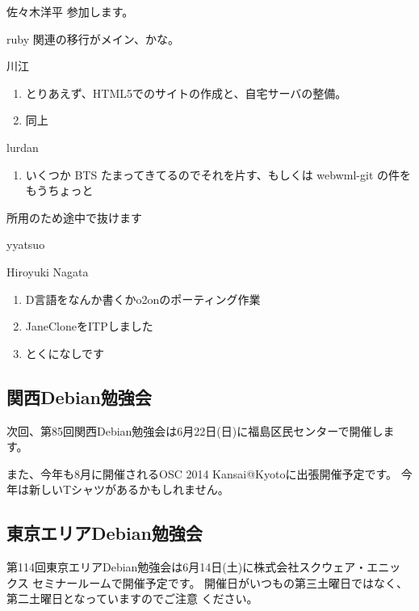 \documentclass[mingoth,a4paper]{jsarticle}
\begin{document}
\begin{prework}{ 佐々木洋平 }
  参加します。

  ruby 関連の移行がメイン、かな。
\end{prework}

\begin{prework}{ 川江 }
  \begin{enumerate}
  \item とりあえず、HTML5でのサイトの作成と、自宅サーバの整備。
  \item 同上
  \end{enumerate}
\end{prework}

\begin{prework}{ lurdan }
  \begin{enumerate}
  \item いくつか BTS たまってきてるのでそれを片す、もしくは webwml-git の件をもうちょっと
  \end{enumerate}

  所用のため途中で抜けます
\end{prework}

\begin{prework}{ yyatsuo }
\end{prework}

\begin{prework}{ Hiroyuki Nagata }
  \begin{enumerate}
  \item D言語をなんか書くかo2onのポーティング作業
  \item JaneCloneをITPしました
  \item とくになしです
  \end{enumerate}
\end{prework}



\subsection{関西Debian勉強会}

次回、第85回関西Debian勉強会は6月22日(日)に福島区民センターで開催します。

また、今年も8月に開催されるOSC 2014 Kansai@Kyotoに出張開催予定です。
今年は新しいTシャツがあるかもしれません。

\subsection{東京エリアDebian勉強会}
第114回東京エリアDebian勉強会は6月14日(土)に株式会社スクウェア・エニッ
クス セミナールームで開催予定です。
開催日がいつもの第三土曜日ではなく、第二土曜日となっていますのでご注意
ください。
\end{document}
